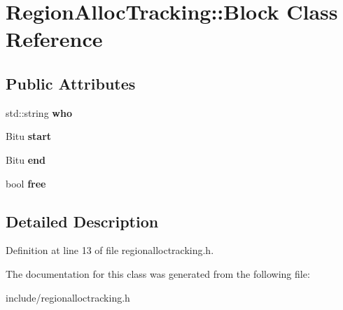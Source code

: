 \hypertarget{classRegionAllocTracking_1_1Block}{\section{Region\-Alloc\-Tracking\-:\-:Block Class Reference}
\label{classRegionAllocTracking_1_1Block}
}
\subsection*{Public Attributes}
\begin{DoxyCompactItemize}
\item 
\hypertarget{classRegionAllocTracking_1_1Block_a72ed7f684a1bb49327fa4b8f109ddfc9}{std\-::string {\bfseries who}}\label{classRegionAllocTracking_1_1Block_a72ed7f684a1bb49327fa4b8f109ddfc9}

\item 
\hypertarget{classRegionAllocTracking_1_1Block_a310d3de7018492b64fd7bac4cb640fb0}{Bitu {\bfseries start}}\label{classRegionAllocTracking_1_1Block_a310d3de7018492b64fd7bac4cb640fb0}

\item 
\hypertarget{classRegionAllocTracking_1_1Block_ab8aa00f0ccd051668d60b36b69f9477e}{Bitu {\bfseries end}}\label{classRegionAllocTracking_1_1Block_ab8aa00f0ccd051668d60b36b69f9477e}

\item 
\hypertarget{classRegionAllocTracking_1_1Block_a10cc004ce165b0bf7c42acd50419c9fd}{bool {\bfseries free}}\label{classRegionAllocTracking_1_1Block_a10cc004ce165b0bf7c42acd50419c9fd}

\end{DoxyCompactItemize}


\subsection{Detailed Description}


Definition at line 13 of file regionalloctracking.\-h.



The documentation for this class was generated from the following file\-:\begin{DoxyCompactItemize}
\item 
include/regionalloctracking.\-h\end{DoxyCompactItemize}
